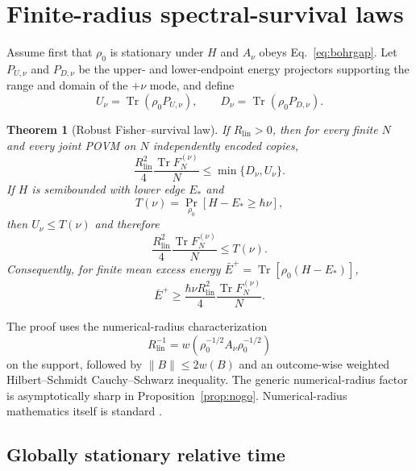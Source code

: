 \documentclass[aps,pra,preprint,nofootinbib]{revtex4-2}
\newtheorem{theorem}{Theorem}
\newcommand{\Tr}{\operatorname{Tr}}
\newcommand{\Rlin}{R_{\mathrm{lin}}}
\newcommand{\rhozero}{\rho_0}
\newcommand{\Fcl}{F}
\begin{document}
\section{Finite-radius spectral-survival laws}
\label{sec:finite-radius}

Assume first that $\rhozero$ is stationary under $H$ and $A_\nu$ obeys Eq.~\eqref{eq:bohrgap}.  Let $P_{U,\nu}$ and $P_{D,\nu}$ be the upper- and lower-endpoint energy projectors supporting the range and domain of the $+\nu$ mode, and define
\begin{equation}
U_\nu=\Tr(\rhozero P_{U,\nu}),\qquad
D_\nu=\Tr(\rhozero P_{D,\nu}).
\end{equation}

\begin{theorem}[Robust Fisher--survival law]
\label{thm:single-survival}
If $\Rlin>0$, then for every finite $N$ and every joint POVM on $N$ independently encoded copies,
\begin{equation}
\boxed{
\frac{\Rlin^2}{4}\frac{\Tr \Fcl_N^{(\nu)}}{N}
\le \min\{D_\nu,U_\nu\}.
}
\label{eq:robust-survival}
\end{equation}
If $H$ is semibounded with lower edge $E_*$ and
\begin{equation}
T(\nu)=\Pr_{\rhozero}[H-E_*\ge\hbar\nu],
\end{equation}
then $U_\nu\le T(\nu)$ and therefore
\begin{equation}
\frac{\Rlin^2}{4}\frac{\Tr \Fcl_N^{(\nu)}}{N}\le T(\nu).
\label{eq:tail-survival}
\end{equation}
Consequently, for finite mean excess energy $\bar E^+=\Tr[\rhozero(H-E_*)]$,
\begin{equation}
\bar E^+\ge
\frac{\hbar\nu\Rlin^2}{4}\frac{\Tr \Fcl_N^{(\nu)}}{N}.
\label{eq:energy-corollary}
\end{equation}
\end{theorem}

The proof uses the numerical-radius characterization
\begin{equation}
\Rlin^{-1}=w(\rhozero^{-1/2}A_\nu\rhozero^{-1/2})
\end{equation}
on the support, followed by $\|B\|\le2w(B)$ and an outcome-wise weighted Hilbert--Schmidt Cauchy--Schwarz inequality.  The generic numerical-radius factor is asymptotically sharp in Proposition~\ref{prop:nogo}.  Numerical-radius mathematics itself is standard \cite{BhatiaJain2023}.

\subsection{Globally stationary relative time}
\end{document}
